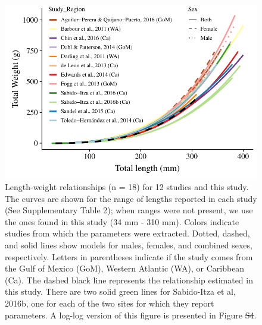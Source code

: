 \documentclass[fleqn,10pt,lineno]{wlpeerj} %
\providecommand{\DIFadd}[1]{{\protect\color{blue}\uwave{#1}}} %
\providecommand{\DIFdel}[1]{{\protect\color{red}\sout{#1}}}                      %
\providecommand{\DIFaddFL}[1]{\DIFadd{#1}} %
\providecommand{\DIFdelFL}[1]{\DIFdel{#1}} %
\providecommand{\DIFaddbeginFL}{} %
\providecommand{\DIFaddendFL}{} %
\providecommand{\DIFdelbeginFL}{} %
\providecommand{\DIFdelendFL}{} %
\begin{document}
\begin{figure}
\centering
\includegraphics{Manuscript_files/figure-latex/fit2-1.pdf}
\caption{\label{fig:all_allo}Length-weight relationships (n = 18) for 12
studies and this study. The curves are shown for the range of lengths
reported in each study (See Supplementary Table 2); when ranges were not
present, we use the ones found in this study (34 mm - 310 mm). Colors
indicate studies from which the parameters were extracted. Dotted,
dashed, and solid lines show models for males, females, and combined
sexes, respectively. Letters in parentheses indicate if the study comes
from the Gulf of Mexico (GoM), Western Atlantic (WA), or Caribbean (Ca).
The dashed black line represents the relationship estimated in this
study. There are two solid green lines for Sabido-Itza et al, 2016b, one
for each of the two sites for which they report parameters. A log-log
version of this figure is presented in Figure \DIFdelbeginFL \DIFdelFL{S4}\DIFdelendFL \DIFaddbeginFL \DIFaddFL{S1}\DIFaddendFL .}
\end{figure}
\end{document}
